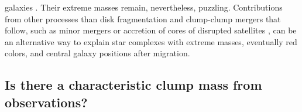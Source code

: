 \documentclass[twocolumn]{aastex61}
\begin{document}
galaxies \citep{wuyts12}. Their extreme masses remain, nevertheless, puzzling. 
Contributions from other processes than disk fragmentation and clump-clump 
mergers that follow, such as minor mergers or accretion of cores of disrupted 
satellites \citep[Ribeiro et~al.\ 2016, in preparation;][]{mandelker17}, can be 
an alternative way to explain star complexes with extreme masses, 
eventually red colors, and central galaxy positions after migration.

%

\subsection{Is there a characteristic clump mass from observations?}
\label{sect:spectrum}

\end{document}
